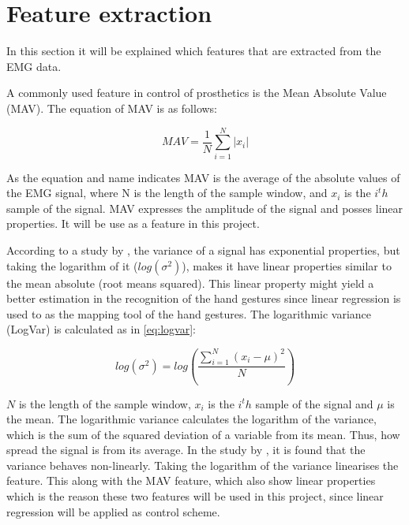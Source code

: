 \section{Feature extraction}
In this section it will be explained which features that are extracted from the EMG data.

A commonly used feature in control of prosthetics is the Mean Absolute Value (MAV). The equation of MAV is as follows:

\begin{equation}
MAV = \frac{1}{N}\sum\limits_{i=1}^N|x_i|
\end{equation}

As the equation and name indicates MAV is the average of the absolute values of the EMG signal, where N is the length of the sample window, and $x_i$ is the $i^th$ sample of the signal. MAV expresses the amplitude of the signal and posses linear properties. It will be use as a feature in this project.

According to a study by \cite{hahne2014}, the variance of a signal has exponential properties, but taking the logarithm of it ($log(\sigma^2)$), makes it have linear properties similar to the mean absolute (root means squared). This linear property might yield a better estimation in the recognition of the hand gestures since linear regression is used to as the mapping tool of the hand gestures. The logarithmic variance (LogVar) is calculated as in \eqref{eq:logvar}:

\begin{equation} \label{eq:logvar}
log(\sigma^2) = log(\frac{\sum\limits_{i=1}^N(x_i - \mu)^2}{N})
\end{equation}

$N$ is the length of the sample window, $x_i$ is the $i^th$ sample of the signal and $\mu$ is the mean. The logarithmic variance calculates the logarithm of the variance, which is the sum of the squared deviation of a variable from its mean. Thus, how spread the signal is from its average. In the study by \cite{hahne2014}, it is found that the variance behaves non-linearly. Taking the logarithm of the variance linearises the feature. This along with the MAV feature, which also show linear properties which is the reason these two features will be used in this project, since linear regression will be applied as control scheme. 


